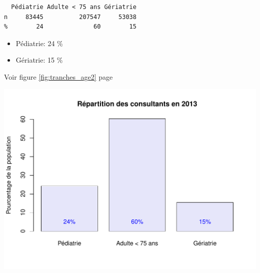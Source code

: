 \documentclass[12pt,english,french,twoside]{book}\usepackage[]{graphicx}\usepackage[]{color}
\makeatletter
\def\maxwidth{ %
  \ifdim\Gin@nat@width>\linewidth
    \linewidth
  \else
    \Gin@nat@width
  \fi
}
\newenvironment{kframe}{%
 \def\at@end@of@kframe{}%
 \ifinner\ifhmode%
  \def\at@end@of@kframe{\end{minipage}}%
  \begin{minipage}{\columnwidth}%
 \fi\fi%
 \def\FrameCommand##1{\hskip\@totalleftmargin \hskip-\fboxsep
 \colorbox{shadecolor}{##1}\hskip-\fboxsep
     \hskip-\linewidth \hskip-\@totalleftmargin \hskip\columnwidth}%
 \MakeFramed {\advance\hsize-\width
   \@totalleftmargin\z@ \linewidth\hsize
   \@setminipage}}%
 {\par\unskip\endMakeFramed%
 \at@end@of@kframe}
\newenvironment{knitrout}{}{} %
\makeatother
\begin{document}


\begin{knitrout}
\color{fgcolor}\begin{kframe}
\begin{verbatim}
  Pédiatrie Adulte < 75 ans Gériatrie
n     83445          207547     53038
%        24              60        15
\end{verbatim}
\end{kframe}
\end{knitrout}


\begin{itemize}
  \item Pédiatrie:  24 \%
  \item Gériatrie:  15 \%
\end{itemize}
Voir figure \ref{fig:tranches_age2} page \pageref{fig:tranches_age2}

\begin{center}
\begin{knitrout}
\color{fgcolor}
\includegraphics[width=\maxwidth]{figure/tranches_age21} 

\end{knitrout}

\label{fig:tranches_age2}
\end{center}

\end{document}
